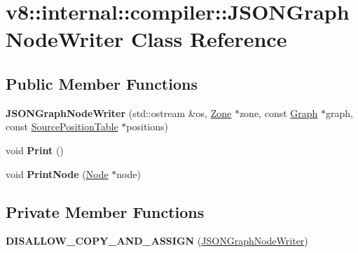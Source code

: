 \hypertarget{classv8_1_1internal_1_1compiler_1_1_j_s_o_n_graph_node_writer}{}\section{v8\+:\+:internal\+:\+:compiler\+:\+:J\+S\+O\+N\+Graph\+Node\+Writer Class Reference}
\label{classv8_1_1internal_1_1compiler_1_1_j_s_o_n_graph_node_writer}
\subsection*{Public Member Functions}
\begin{DoxyCompactItemize}
\item 
{\bfseries J\+S\+O\+N\+Graph\+Node\+Writer} (std\+::ostream \&os, \hyperlink{classv8_1_1internal_1_1_zone}{Zone} $\ast$zone, const \hyperlink{classv8_1_1internal_1_1compiler_1_1_graph}{Graph} $\ast$graph, const \hyperlink{classv8_1_1internal_1_1compiler_1_1_source_position_table}{Source\+Position\+Table} $\ast$positions)\hypertarget{classv8_1_1internal_1_1compiler_1_1_j_s_o_n_graph_node_writer_a00a6f7ea66b737bc499c97abc05a8051}{}\label{classv8_1_1internal_1_1compiler_1_1_j_s_o_n_graph_node_writer_a00a6f7ea66b737bc499c97abc05a8051}

\item 
void {\bfseries Print} ()\hypertarget{classv8_1_1internal_1_1compiler_1_1_j_s_o_n_graph_node_writer_ad9109769d2da824469bfdc3d1363da89}{}\label{classv8_1_1internal_1_1compiler_1_1_j_s_o_n_graph_node_writer_ad9109769d2da824469bfdc3d1363da89}

\item 
void {\bfseries Print\+Node} (\hyperlink{classv8_1_1internal_1_1compiler_1_1_node}{Node} $\ast$node)\hypertarget{classv8_1_1internal_1_1compiler_1_1_j_s_o_n_graph_node_writer_a726e1ae8ff6c2023632ef88447c943fa}{}\label{classv8_1_1internal_1_1compiler_1_1_j_s_o_n_graph_node_writer_a726e1ae8ff6c2023632ef88447c943fa}

\end{DoxyCompactItemize}
\subsection*{Private Member Functions}
\begin{DoxyCompactItemize}
\item 
{\bfseries D\+I\+S\+A\+L\+L\+O\+W\+\_\+\+C\+O\+P\+Y\+\_\+\+A\+N\+D\+\_\+\+A\+S\+S\+I\+GN} (\hyperlink{classv8_1_1internal_1_1compiler_1_1_j_s_o_n_graph_node_writer}{J\+S\+O\+N\+Graph\+Node\+Writer})\hypertarget{classv8_1_1internal_1_1compiler_1_1_j_s_o_n_graph_node_writer_a1a46277646fc7f269eb63b7c8d4c8acb}{}\label{classv8_1_1internal_1_1compiler_1_1_j_s_o_n_graph_node_writer_a1a46277646fc7f269eb63b7c8d4c8acb}

\end{DoxyCompactItemize}
